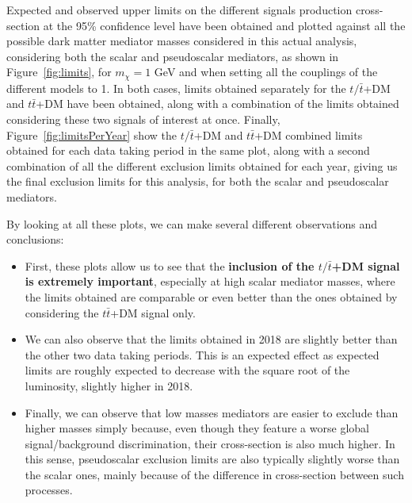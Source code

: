 \documentclass[a4paper, 10pt, openright]{report}
\begin{document}
Expected and observed upper limits on the different signals production cross-section at the 95\% confidence level have been obtained and plotted against all the possible dark matter mediator masses considered in this actual analysis, considering both the scalar and pseudoscalar mediators, as shown in Figure~\ref{fig:limits}, for $m_\chi = 1$ GeV and when setting all the couplings of the different models to 1. In both cases, limits obtained separately for the $t/\bar t$+DM and $t \bar t$+DM have been obtained, along with a combination of the limits obtained considering these two signals of interest at once. Finally, Figure~\ref{fig:limitsPerYear} show the $t/\bar t$+DM and $t \bar t$+DM combined limits obtained for each data taking period in the same plot, along with a second combination of all the different exclusion limits obtained for each year, giving us the final exclusion limits for this analysis, for both the scalar and pseudoscalar mediators.

By looking at all these plots, we can make several different observations and conclusions:
\begin{itemize}
\item First, these plots allow us to see that the \textbf{inclusion of the $t/\bar t$+DM signal is extremely important}, especially at high scalar mediator masses, where the limits obtained are comparable or even better than the ones obtained by considering the $t \bar t$+DM signal only.
\item We can also observe that the limits obtained in 2018 are slightly better than the other two data taking periods. This is an expected effect as expected limits are roughly expected to decrease with the square root of the luminosity, slightly higher in 2018.
\item Finally, we can observe that low masses mediators are easier to exclude than higher masses simply because, even though they feature a worse global signal/background discrimination, their cross-section is also much higher. In this sense, pseudoscalar exclusion limits are also typically slightly worse than the scalar ones, mainly because of the difference in cross-section between such processes.
\end{itemize}
\end{document}
